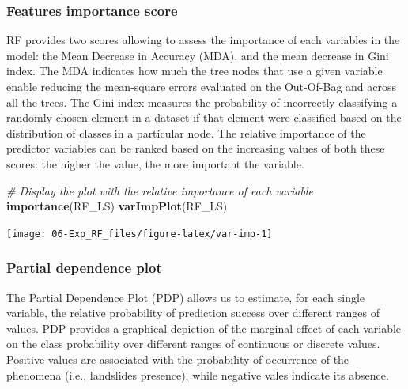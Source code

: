\documentclass[
]{article}
\newenvironment{Shaded}{\begin{snugshade}}{\end{snugshade}}
\newcommand{\AttributeTok}[1]{\textcolor[rgb]{0.13,0.29,0.53}{#1}}
\newcommand{\CommentTok}[1]{\textcolor[rgb]{0.56,0.35,0.01}{\textit{#1}}}
\newcommand{\ConstantTok}[1]{\textcolor[rgb]{0.56,0.35,0.01}{#1}}
\newcommand{\DecValTok}[1]{\textcolor[rgb]{0.00,0.00,0.81}{#1}}
\newcommand{\FunctionTok}[1]{\textcolor[rgb]{0.13,0.29,0.53}{\textbf{#1}}}
\newcommand{\NormalTok}[1]{#1}
\newcommand{\SpecialCharTok}[1]{\textcolor[rgb]{0.81,0.36,0.00}{\textbf{#1}}}
\newcommand{\StringTok}[1]{\textcolor[rgb]{0.31,0.60,0.02}{#1}}
\begin{document}
\subsubsection{Features importance score}\label{features-importance-score}

RF provides two scores allowing to assess the importance of each variables in the model: the Mean Decrease in Accuracy (MDA), and the mean decrease in Gini index.
The MDA indicates how much the tree nodes that use a given variable enable reducing the mean-square errors evaluated on the Out-Of-Bag and across all the trees.
The Gini index measures the probability of incorrectly classifying a randomly chosen element in a dataset if that element were classified based on the distribution of classes in a particular node.
The relative importance of the predictor variables can be ranked based on the increasing values of both these scores: the higher the value, the more important the variable.

\begin{Shaded}
\begin{Highlighting}[]
\CommentTok{\# Display the plot with the relative importance of each variable}
\FunctionTok{importance}\NormalTok{(RF\_LS)}
\FunctionTok{varImpPlot}\NormalTok{(RF\_LS)}
\end{Highlighting}
\end{Shaded}

\begin{center}\texttt{[image: 06-Exp\_RF\_files/figure-latex/var-imp-1]} \end{center}

\subsubsection{Partial dependence plot}\label{partial-dependence-plot}

The Partial Dependence Plot (PDP) allows us to estimate, for each single variable, the relative probability of prediction success over different ranges of values.
PDP provides a graphical depiction of the marginal effect of each variable on the class probability over different ranges of continuous or discrete values.
Positive values are associated with the probability of occurrence of the phenomena (i.e., landslides presence), while negative vales indicate its absence.

\begin{Shaded}
\end{Shaded}
\end{document}

